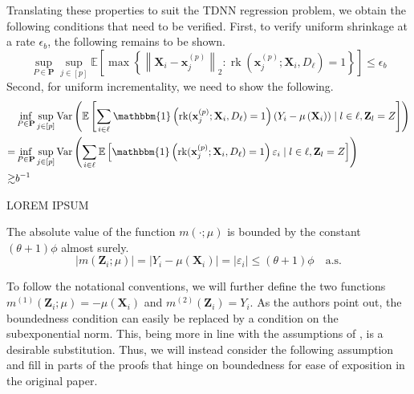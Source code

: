 \documentclass[letterpaper,10pt]{article}
\numberwithin{equation}{section}
\numberwithin{theorem}{section}
\theoremstyle{definition}
\newcommand{\1}{\mathbb{1}}
\begin{document}
Translating these properties to suit the TDNN regression problem, we obtain the following conditions that need to be verified.
First, to verify uniform shrinkage at a rate $\epsilon_b$, the following remains to be shown.
\begin{equation}
	\sup_{P \in \mathbf{P}} \sup_{j \in[p]}
	\mathbb{E}\left[\max \left\{\left\|\mathbf{X}_i-\mathbf{x}^{(p)}_{j}\right\|_{2}:
	\operatorname{rk}(\mathbf{x}^{(p)}_{j}; \mathbf{X}_i, D_{\ell}) = 1\right\}\right]
	\leq \epsilon_b
\end{equation}
Second, for uniform incrementality, we need to show the following.
\begin{equation}
	\begin{aligned}
		& \inf_{P \in \mathbf{P}} \sup_{j \in[p]}
		\operatorname{Var}\left(\mathbb{E}\left[
				\sum_{i \in \ell} \mathbbm{1}\left(\operatorname{rk}(\mathbf{x}^{(p)}_{j}; \mathbf{X}_i, D_{\ell}) = 1\right) \left(Y_i - \mu\left(\mathbf{X}_i\right)\right) \mid l \in \ell, \mathbf{Z}_l = Z\right]
				\right) \\
		= & \inf_{P \in \mathbf{P}} \sup_{j \in[p]} 
		\operatorname{Var}\left(
			\sum_{i \in \ell}\mathbb{E}\left[\mathbbm{1}\left(\operatorname{rk}(\mathbf{x}^{(p)}_{j}; \mathbf{X}_i, D_{\ell}) = 1\right) \varepsilon_i \mid l \in \ell, \mathbf{Z}_l = Z\right]
		\right)\\
		\gtrsim & b^{-1}
	\end{aligned}
\end{equation}

\citet{peng_rates_2022}

{\color{red} LOREM IPSUM}

\vspace{0.5cm}
\begin{assumption}
	The absolute value of the function $m(\cdot; \mu)$ is bounded by the constant $(\theta+1) \phi$ almost surely.
	\begin{equation}
		|m(\mathbf{Z}_i ; \mu)|
		= |Y_i - \mu(\mathbf{X}_i)|
		= |\varepsilon_i|
		\leq (\theta+1) \phi
		\quad \text{a.s.}
	\end{equation}
\end{assumption}
To follow the notational conventions, we will further define the two functions $m^{(1)}(\mathbf{Z}_i; \mu) = - \mu(\mathbf{X}_i)$ and $m^{(2)}(\mathbf{Z}_i) = Y_i$.
As the authors point out, the boundedness condition can easily be replaced by a condition on the subexponential norm.
This, being more in line with the assumptions of \citet{demirkaya_optimal_2024}, is a desirable substitution.
Thus, we will instead consider the following assumption and fill in parts of the proofs that hinge on boundedness for ease of exposition in the original paper.
\end{document}
